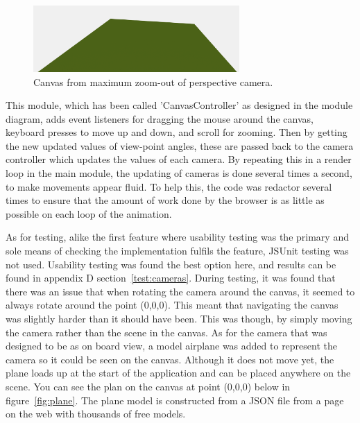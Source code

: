 \begin{figure}[h!]
  \centering
      \includegraphics[width=0.7\textwidth]{images/zoom.png}
  \caption{Canvas from maximum zoom-out of perspective camera.}
  \label{fig:zoom}
\end{figure}

This module, which has been called 'CanvasController' as designed in the module diagram, adds event listeners for dragging the mouse around the canvas, keyboard presses to move up and down, and scroll for zooming. Then by getting the new updated values of view-point angles, these are passed back to the camera controller which updates the values of each camera. By repeating this in a render loop in the main module, the updating of cameras is done several times a second, to make movements appear fluid. To help this, the code was redactor several times to ensure that the amount of work done by the browser is as little as possible on each loop of the animation.

As for testing, alike the first feature where usability testing was the primary and sole means of checking the implementation fulfils the feature, JSUnit testing was not used. Usability testing was found the best option here, and results can be found in appendix D section~\ref{test:cameras}. During testing, it was found that there was an issue that when rotating the camera around the canvas, it seemed to always rotate around the point (0,0,0). This meant that navigating the canvas was slightly harder than it should have been. This was  though, by simply moving the camera rather than the scene in the canvas. As for the camera that was designed to be as on board view, a model airplane was added to represent the camera so it could be seen on the canvas. Although it does not move yet, the plane loads up at the start of the application and can be placed anywhere on the scene. You can see the plan on the canvas at point (0,0,0) below in figure~\ref{fig:plane}. The plane model is constructed from a JSON file from a page on the web with thousands of free models.

\clearpage

